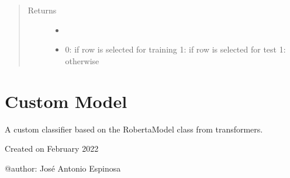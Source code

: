 \documentclass[letterpaper,10pt,english]{sphinxmanual}
\begin{document}
\begin{fulllineitems}
\begin{fulllineitems}
\begin{quote}
\begin{description}
\item[{Returns}] \leavevmode
\sphinxAtStartPar
\begin{itemize}
\item {} 
\sphinxAtStartPar
{}

\item {} 
\sphinxAtStartPar
{} \textendash{} 0: if row is selected for training
1: if row is selected for test
\sphinxhyphen{}1: otherwise

\end{itemize}


\end{description}\end{quote}

\end{fulllineitems}


\end{fulllineitems}



\chapter{Custom Model}
\label{\detokenize{dc_custom_model:custom-model}}\label{\detokenize{dc_custom_model::doc}}\label{\detokenize{dc_custom_model:module-src.domain_classifier.custom_model}}
\sphinxAtStartPar
A custom classifier based on the RobertaModel class from transformers.

\sphinxAtStartPar
Created on February 2022

\sphinxAtStartPar
@author: José Antonio Espinosa
\end{document}
